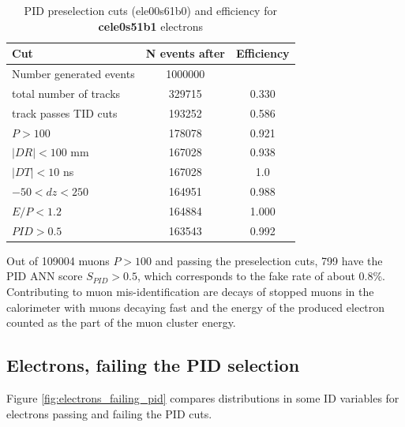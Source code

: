 \begin{table}[H]
  \begin{center}
    \begin{tabular}{l|c|c} %
      \textbf{Cut}                    & \textbf{N events after } & \textbf{Efficiency }\\
      \hline
      Number generated events         & 1000000          &            \\
      total number of tracks          &  329715          &   0.330    \\
      \hline
      track passes TID cuts           &  193252          &   0.586    \\
      $P > 100$                       &  178078          &   0.921    \\
      $|DR| < 100$ mm                 &  167028          &   0.938    \\
      $|DT| < 10$ ns                  &  167028          &   1.0      \\
      $-50 < dz < 250$                &  164951          &   0.988    \\
      $ E/P < 1.2$                    &  164884          &   1.000    \\
      \hline
      $PID >0.5$                      &  163543          &   0.992    \\
   \end{tabular}
  \end{center}
  \caption{
    \label{tab:pid_preselection_cuts}
    PID preselection cuts (ele00s61b0) and efficiency for {\bf cele0s51b1} electrons 
  }
\end{table}

Out of 109004 muons $P > 100$ and passing the preselection cuts, 799 have the PID ANN score $S_{PID} > 0.5$,
which corresponds to the fake rate of about 0.8\%. Contributing to muon mis-identification are decays of
stopped muons in the calorimeter with muons decaying fast and the energy of the produced electron counted
as the part of the muon cluster energy. 


\subsection { Electrons, failing the PID selection}
\label{sec:electrons_failing_pid}

Figure \ref{fig:electrons_failing_pid} compares distributions in some ID variables for electrons 
passing and failing the PID cuts.


